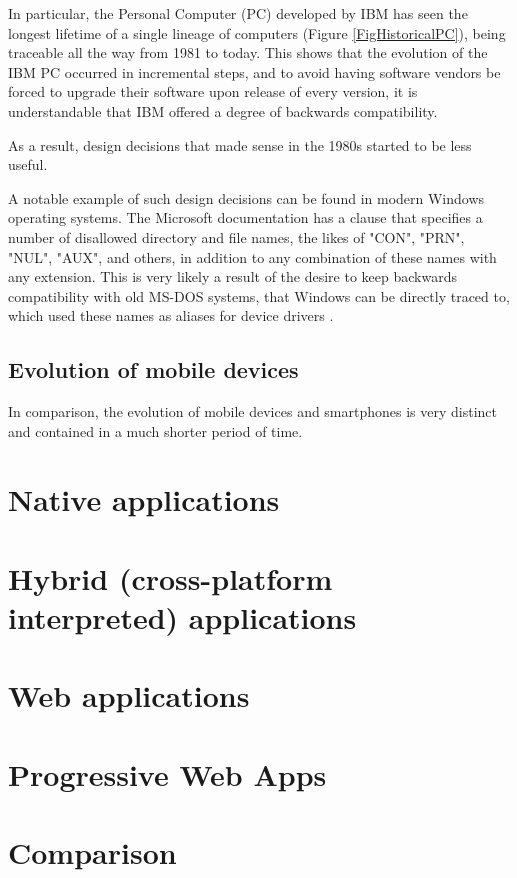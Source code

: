 In particular, the Personal Computer (PC) developed by IBM has seen the longest lifetime of a single lineage of computers (Figure \ref{FigHistoricalPC}), being traceable all the way from 1981 to today. This shows that the evolution of the IBM PC occurred in incremental steps, and to avoid having software vendors be forced to upgrade their software upon release of every version, it is understandable that IBM offered a degree of backwards compatibility.

As a result, design decisions that made sense in the 1980s started to be less useful.

A notable example of such design decisions can be found in modern Windows operating systems. The Microsoft documentation \cite{MSDNFolderNaming} has a clause that specifies a number of disallowed directory and file names, the likes of "CON", "PRN", "NUL", "AUX", and others, in addition to any combination of these names with any extension. This is very likely a result of the desire to keep backwards compatibility with old MS-DOS systems, that Windows can be directly traced to, which used these names as aliases for device drivers \cite{HusseinDeviceDrivers}.

\subsection{Evolution of mobile devices}
In comparison, the evolution of mobile devices and smartphones is very distinct and contained in a much shorter period of time.

\section{Native applications}

\section{Hybrid (cross-platform interpreted) applications}

\section{Web applications}

\section{Progressive Web Apps}

\section{Comparison}
